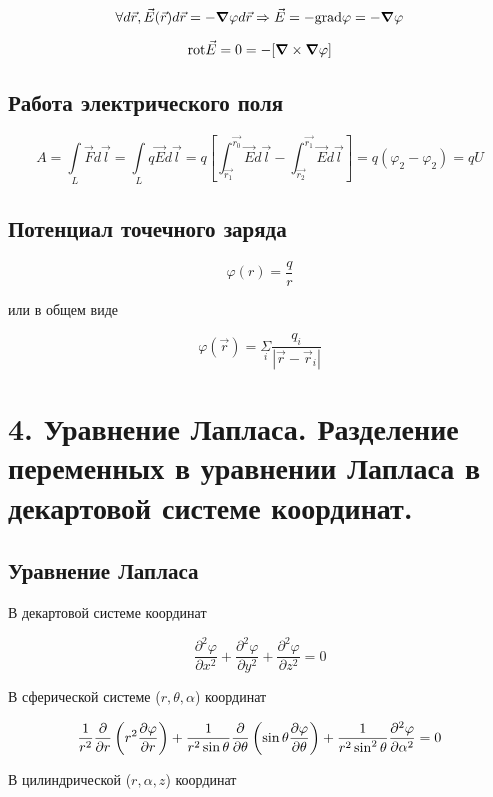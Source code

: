 \documentclass[a4paper,12pt]{article}
\newcommand{\fc}[1]{\[#1\]}
\newcommand{\mm}[1]{\mathrm{#1}}
\begin{document}
\fc{\forall d\vec{r} , \vec{E}(\vec{r})d\vec{r}=-\grad \varphi d\vec{r} \Rightarrow \vec{E}=-\mm{grad} \varphi=-\grad \varphi }

\fc{\mm{rot}\vec{E}=0=-[\grad \times \grad \varphi]}  

\newpage

\subsection*{Работа электрического поля}

\fc{A=\underset{L}{\int}\vec{F}d\vec{l}=\underset{L}{\int}q\vec{E}d\vec{l}=q\left[\int_{\vec{r_1}}^{\vec{r_0}}\vec{E}d\vec{l}- \int_{\vec{r_2}}^{\vec{r_1}}\vec{E}d\vec{l}   \right]=q(\varphi_2-\varphi_2)=qU}

\subsection*{Потенциал точечного заряда}

\fc{\varphi(r) = \frac{q}{r}}

или в общем виде

\fc{\varphi(\vec{r}) = \underset{i}{\Sigma} \frac{q_i}{|\vec{r} - \vec{r}_i|}}

\section*{4. Уравнение Лапласа. Разделение переменных в уравнении Лапласа в
декартовой системе координат.}

\subsection*{Уравнение Лапласа}

В декартовой системе координат

\fc{\displaystyle {\frac {\partial ^{2}\varphi}{\partial x^{2}}}+{\frac {\partial ^{2}\varphi}{\partial y^{2}}}+{\frac {\partial ^{2}\varphi}{\partial z^{2}}}=0}

В сферической системе ($r,\theta,\alpha$) координат

\fc{{\displaystyle {1 \over r^{2}}{\partial  \over \partial r}\left(r^{2}{\partial \varphi \over \partial r}\right)+{1 \over r^{2}\sin \theta }{\partial  \over \partial \theta }\left(\sin \theta {\partial \varphi \over \partial \theta }\right)+{1 \over r^{2}\sin ^{2}\theta }{\partial ^{2}\varphi \over \partial \alpha ^{2}}=0}}

В цилиндрической ($r,\alpha,z$) координат
\end{document}

